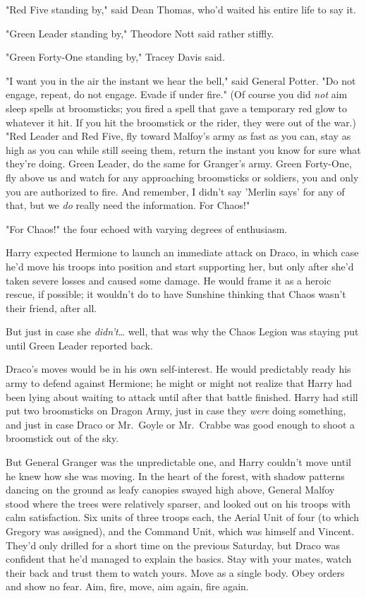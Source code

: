 "Red Five standing by," said Dean Thomas, who'd waited his entire life to say 
it.

"Green Leader standing by," Theodore Nott said rather stiffly.

"Green Forty-One standing by," Tracey Davis said.

"I want you in the air the instant we hear the bell," said General Potter. "Do 
not engage, repeat, do not engage. Evade if under fire." (Of course you did 
\emph{not} aim sleep spells at broomsticks; you fired a spell that gave a 
temporary red glow to whatever it hit. If you hit the broomstick or the rider, 
they were out of the war.) "Red Leader and Red Five, fly toward Malfoy's army 
as fast as you can, stay as high as you can while still seeing them, return the 
instant you know for sure what they're doing. Green Leader, do the same for 
Granger's army. Green Forty-One, fly above us and watch for any approaching 
broomsticks or soldiers, you and only you are authorized to fire. And remember, 
I didn't say 'Merlin says' for any of that, but we \emph{do} really need the 
information. For Chaos!"

"For Chaos!" the four echoed with varying degrees of enthusiasm.

Harry expected Hermione to launch an immediate attack on Draco, in which case 
he'd move his troops into position and start supporting her, but only after 
she'd taken severe losses and caused some damage. He would frame it as a heroic 
rescue, if possible; it wouldn't do to have Sunshine thinking that Chaos wasn't 
their friend, after all.

But just in case she \emph{didn't}{\ldots} well, that was why the Chaos Legion 
was staying put until Green Leader reported back.

Draco's moves would be in his own self-interest. He would predictably ready his 
army to defend against Hermione; he might or might not realize that Harry had 
been lying about waiting to attack until after that battle finished. Harry had 
still put two broomsticks on Dragon Army, just in case they \emph{were} doing 
something, and just in case Draco or Mr.~Goyle or Mr.~Crabbe was good enough to 
shoot a broomstick out of the sky.

But General Granger was the unpredictable one, and Harry couldn't move until he 
knew how she was moving.
\sbreak
In the heart of the forest, with shadow patterns dancing on the ground as leafy 
canopies swayed high above, General Malfoy stood where the trees were 
relatively sparser, and looked out on his troops with calm satisfaction. Six 
units of three troops each, the Aerial Unit of four (to which Gregory was 
assigned), and the Command Unit, which was himself and Vincent. They'd only 
drilled for a short time on the previous Saturday, but Draco was confident that 
he'd managed to explain the basics. Stay with your mates, watch their back and 
trust them to watch yours. Move as a single body. Obey orders and show no fear. 
Aim, fire, move, aim again, fire again.

